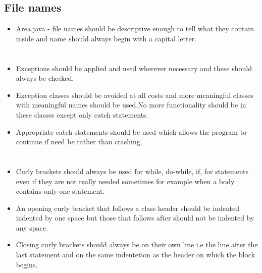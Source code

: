 \documentclass[12pt]{article}
\begin{document}
   \subsection{File names}
    \begin{itemize} 
  		\item Area.java - file names should be descriptive enough to tell what they contain inside and name should always 	begin with a capital letter.
	\end{itemize} 
	
 \section{\bfseries\selectfont{Exceptions}}	
 	\begin{itemize} 
 		\item Exceptions should be applied and used wherever necessary and these should always be checked.
 		\item Exception classes should be avoided at all costs and more meaningful classes with meaningful names should be used.No more functionality should be in these classes except only catch 	statements.
 		\item Appropriate catch statements should be used which allows the program to continue if need be rather than crashing.
	\end{itemize} 
	
	\section{\bfseries\selectfont{Bracketing}}
	\begin{itemize}
		\item Curly brackets should always be used for while, do-while, if, for statements even if they are not really needed 	sometimes for example when a body contains only one statement.
		\item An opening curly bracket that follows a class header should be indented indented by one space but those that follows after should not be indented by any space.
		\item Closing curly brackets should always be on their own line i.e the line after the last statement and on the same indentetion as the header on which the block begins.
		
		
	\end{itemize}
\end{document}
